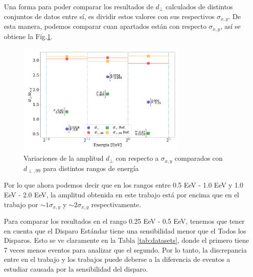 
    Una forma  para poder comparar los resultados de $d_\perp$ calculados de distintos conjuntos de  datos entre sí, es dividir estos valores con  sus respectivos $\sigma_{x,y}$. De esta manera, podemos comparar cuan apartados están con respecto $\sigma_{x,y}$, así se obtiene la Fig.\ref{fig:normalizado_sigma}.

    \begin{figure}[H]
        \begin{small}
            \begin{center}
                \includegraphics[width=0.75\textwidth]{d_perp_normalizado_sigmas_v5.pdf}
            \end{center}
            \caption{Variaciones de la amplitud $d_\perp$ con respecto a $\sigma_{x,y}$ comparados con $d_{\perp,99}$ para distintos rangos de energía }
            \label{fig:normalizado_sigma}
        \end{small}
    \end{figure}

Por lo que ahora podemos decir que en los rangos entre 0.5 EeV - 1.0 EeV y 1.0 EeV - 2.0 EeV, la amplitud obtenida en este trabajo está por encima que en el trabajo \cite{Aab_2020} por $\sim 1\sigma_{x,y}$ y $\sim 2 \sigma_{x,y}$ respectivamente.

Para comparar los resultados en el  rango 0.25 EeV - 0.5 EeV, tenemos que tener en cuenta que el Disparo Estándar tiene una sensibilidad menor que el Todos los Disparos. Esto se ve claramente en la Tabla \ref{tab:datasets}, donde el primero tiene 7 veces menos eventos para analizar que el segundo. Por lo tanto, la discrepancia entre en el trabajo \cite{Aab_2020} y los trabajos puede deberse a la  diferencia de eventos a estudiar causada por la sensibilidad del disparo.


